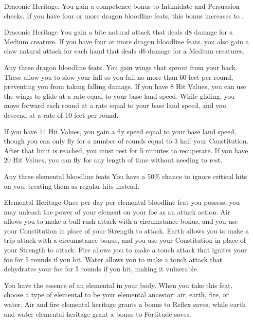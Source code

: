  Draconic Heritage.
 You gain a  competence bonus to Intimidate and Persuasion checks. If you have four or more dragon bloodline feats, this bonus increases to .

 Draconic Heritage
 You gain a bite natural attack that deals d8 damage for a Medium creature. If you have four or more dragon bloodline feats, you also gain a claw natural attack for each hand that deals d6 damage for a Medium creatures.

 Any three dragon bloodline feats.
 You gain wings that sprout from your back. These allow you to slow your fall so you fall no more than 60 feet per round, preventing you from taking falling damage. If you have 8 Hit Values, you can use the wings to glide at a rate equal to your base land speed. While gliding, you move forward each round at a rate equal to your base land speed, and you descend at a rate of 10 feet per round.

If you have 14 Hit Values, you gain a fly speed equal to your base land speed, though you can only fly for a number of rounds equal to 3 \add half your Constitution. After that limit is reached, you must rest for 5 minutes to recuperate. If you have 20 Hit Values, you can fly for any length of time without needing to rest.

\featpre Any three elemental bloodline feats
\featben You have a 50\% chance to ignore critical hits on you, treating them as regular hits instead.

\featpre Elemental Heritage
\featben Once per day per elemental bloodline feat you possess, you may unleash the power of your element on your foe as an attack action. Air allows you to make a bull rush attack with a  circumstance bonus, and you use your Constitution in place of your Strength to attack. Earth allows you to make a trip attack with a  circumstance bonus, and you use your Constitution in place of your Strength to attack. Fire allows you to make a touch attack that ignites your foe for 5 rounds if you hit. Water allows you to make a touch attack that dehydrates your foe for 5 rounds if you hit, making it vulnerable.

\featben You have the essence of an elemental in your body. When you take this feat, choose a type of elemental to be your elemental ancestor: air, earth, fire, or water. Air and fire elemental heritage grants a  bonus to Reflex saves, while earth and water elemental heritage grant a  bonus to Fortitude saves.

